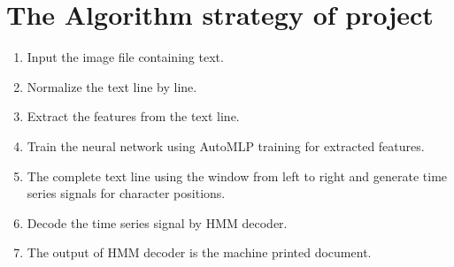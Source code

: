 \section{The Algorithm strategy of project}
\begin{enumerate}
\item  Input the image file containing text.
\item  Normalize the text line by line.
\item  Extract the features from the text line.
\item  Train the neural network using AutoMLP training for extracted features. 
\item The complete text line using the window from left to right and generate time series signals for character positions.
\item  Decode the time series signal by HMM decoder.
\item The output of HMM decoder is the machine printed document.
 \end{enumerate}

